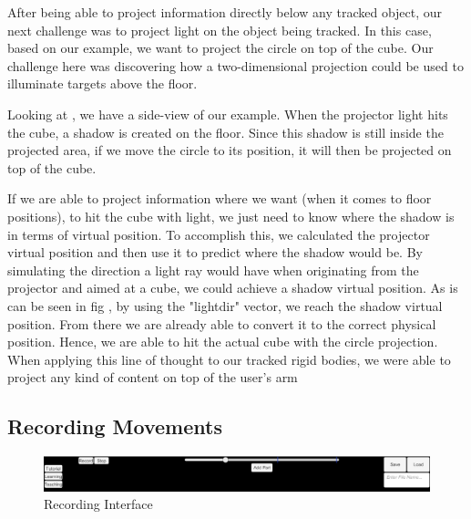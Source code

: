 After being able to project information directly below any tracked object, our next challenge was to project light on the object being tracked. 
In this case, based on our example, we want to project the circle on top of the cube. 
Our challenge here was discovering how a two-dimensional projection could be used to illuminate targets above the floor.



Looking at , we have a side-view of our example. When the projector light hits the cube, a shadow is created on the floor. 
Since this shadow is still inside the projected area, if we move the circle to its position, it will then be projected on top of the cube.

If we are able to project information where we want (when it comes to floor positions), to hit the cube with light, we just need to know where the shadow is in terms of virtual position. 
To accomplish this, we calculated the projector virtual position and then use it to predict where the shadow would be. 
By simulating the direction a light ray would have when originating from the projector and aimed at a cube, we could achieve a shadow virtual position. 
As is can be seen in fig , by using the "lightdir" vector, we reach the shadow virtual position. 
From there we are already able to convert it to the correct physical position. Hence, we are able to hit the actual cube with the circle projection.
When applying this line of thought to our tracked rigid bodies, we were able to project any kind of content on top of the user's arm

\subsection{Recording Movements}

\begin{figure}[!t]
    \begin{center}
        \includegraphics[width=\textwidth]{imgs/impl/recordinginterface}
    \end{center}
    \caption{Recording Interface }
    \label{fig:recordinginterface}
\end{figure}


